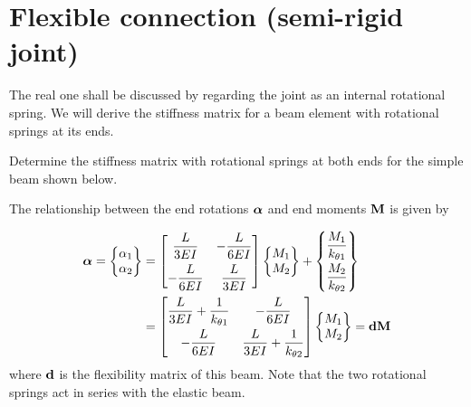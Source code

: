 \section{Flexible connection (semi-rigid joint)}
\begin{fig}
  
\end{fig}
The real one shall be discussed by regarding the joint as an internal rotational spring. We will derive the stiffness matrix for a beam element with rotational springs at its ends.

\begin{example}
Determine the stiffness matrix with rotational springs at both ends for the simple beam shown below.
\begin{fig}
  
\end{fig}
The relationship between the end rotations $\bm{\alpha}$ and end moments $\mathbf{M}$ is given by
\begin{fig}
  
\end{fig}
\begin{equation*}
  \begin{aligned}
    \bm{\alpha} = \begin{Bmatrix}\alpha_1\\ \alpha_2\end{Bmatrix} &= \begin{bmatrix}\dfrac{L}{3EI} & -\dfrac{L}{6EI}\\[8pt] -\dfrac{L}{6EI} & \dfrac{L}{3EI}\end{bmatrix}\begin{Bmatrix}M_1\\ M_2\end{Bmatrix} + \begin{Bmatrix}\dfrac{M_1}{k_{\theta1}}\\[8pt] \dfrac{M_2}{k_{\theta2}}\end{Bmatrix}\\
    &= \begin{bmatrix}\dfrac{L}{3EI} + \dfrac{1}{k_{\theta1}} & -\dfrac{L}{6EI}\\[8pt] -\dfrac{L}{6EI} & \dfrac{L}{3EI} + \dfrac{1}{k_{\theta2}}\end{bmatrix}\begin{Bmatrix}M_1\\ M_2\end{Bmatrix} = \mathbf{d}\mathbf{M}
  \end{aligned}
\end{equation*}
where $\mathbf{d}$ is the flexibility matrix of this beam. Note that the two rotational springs act in series with the elastic beam.


\end{example}
